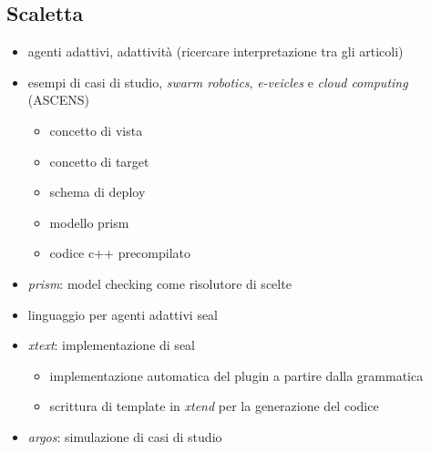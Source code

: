 \subsection{Scaletta}
\begin{itemize}
	\item agenti adattivi, adattività (ricercare interpretazione tra gli articoli)
	\item esempi di casi di studio, \emph{swarm robotics}, \emph{e-veicles} e \emph{cloud computing} (ASCENS)
	\begin{itemize}
		\item concetto di vista
		\item concetto di target
		\item schema di deploy
		\item modello prism
		\item codice c++ precompilato
	\end{itemize}
	\item \emph{prism}: model checking come risolutore di scelte
	\item linguaggio per agenti adattivi \ac{seal}
	\item \emph{xtext}: implementazione di \ac{seal}
	\begin{itemize}
		\item implementazione automatica del plugin a partire dalla grammatica
		\item scrittura di template in \emph{xtend} per la generazione del codice
	\end{itemize}
	\item \emph{argos}: simulazione di casi di studio
\end{itemize}